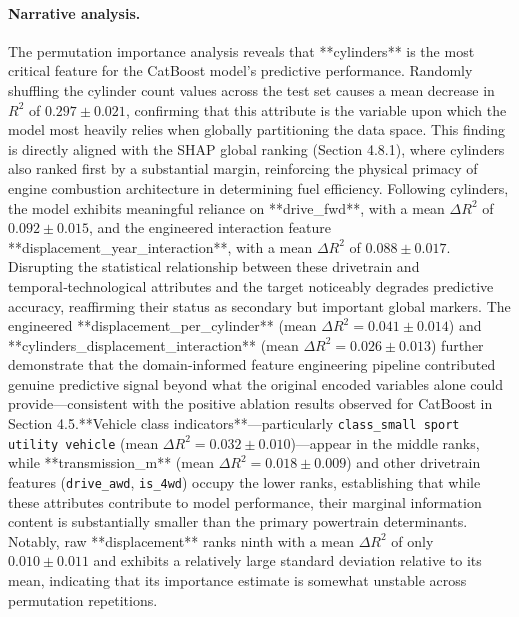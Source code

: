 \paragraph{Narrative analysis.}
The permutation importance analysis reveals that **cylinders** is the most critical feature for the CatBoost model's predictive performance. Randomly shuffling the cylinder count values across the test set causes a mean decrease in \(R^2\) of \(0.297 \pm 0.021\), confirming that this attribute is the variable upon which the model most heavily relies when globally partitioning the data space. This finding is directly aligned with the SHAP global ranking (Section 4.8.1), where cylinders also ranked first by a substantial margin, reinforcing the physical primacy of engine combustion architecture in determining fuel efficiency.
Following cylinders, the model exhibits meaningful reliance on **drive\_fwd**, with a mean \(\Delta R^2\) of \(0.092 \pm 0.015\), and the engineered interaction feature **displacement\_year\_interaction**, with a mean \(\Delta R^2\) of \(0.088 \pm 0.017\). Disrupting the statistical relationship between these drivetrain and temporal‑technological attributes and the target noticeably degrades predictive accuracy, reaffirming their status as secondary but important global markers. The engineered **displacement\_per\_cylinder** (mean \(\Delta R^2 = 0.041 \pm 0.014\)) and **cylinders\_displacement\_interaction** (mean \(\Delta R^2 = 0.026 \pm 0.013\)) further demonstrate that the domain‑informed feature engineering pipeline contributed genuine predictive signal beyond what the original encoded variables alone could provide—consistent with the positive ablation results observed for CatBoost in Section 4.5.**Vehicle class indicators**—particularly \texttt{class\_small sport utility vehicle} (mean \(\Delta R^2 = 0.032 \pm 0.010\))—appear in the middle ranks, while **transmission\_m** (mean \(\Delta R^2 = 0.018 \pm 0.009\)) and other drivetrain features (\texttt{drive\_awd}, \texttt{is\_4wd}) occupy the lower ranks, establishing that while these attributes contribute to model performance, their marginal information content is substantially smaller than the primary powertrain determinants. Notably, raw **displacement** ranks ninth with a mean \(\Delta R^2\) of only \(0.010 \pm 0.011\) and exhibits a relatively large standard deviation relative to its mean, indicating that its importance estimate is somewhat unstable across permutation repetitions.
